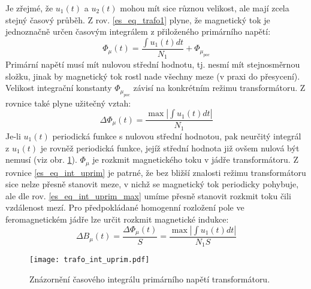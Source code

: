       Je zřejmé, že $u_1(t)$ a  $u_2(t)$ mohou mít sice různou velikost, ale mají zcela stejný 
      časový průběh. Z rov. \ref{es_eq_trafo1} plyne, že magnetický tok je jednoznačně určen 
      časovým integrálem z přiloženého primárního napětí:
      \begin{equation}\label{es_eq_int_uprim}
          \Phi_\mu(t)=\frac{\int u_1(t)dt}{N_1}+\Phi_{\mu_{poc}}
      \end{equation}
      Primární napětí musí mít nulovou střední hodnotu, tj. nesmí mít stejnosměrnou složku, jinak 
      by magnetický tok rostl nade všechny meze (v praxi do přesycení). Velikost integrační 
      konstanty $\Phi_{\mu_{poc}}$ závisí na konkrétním režimu transformátoru. Z rovnice také plyne 
      užitečný vztah:
      \begin{equation}\label{es_eq_int_uprim_max}
          \Delta\Phi_\mu(t)=\frac{\max\left\lvert\int u_1(t)dt\right\rvert}{N_1}
      \end{equation}
      Je-li $u_1(t)$ periodická funkce s nulovou střední hodnotou, pak neurčitý integrál z $u_1(t)$
      je rovněž periodická funkce, jejíž střední hodnota již ovšem nulová být nemusí (viz obr.
      \ref{es:fig_trafo_int_uprim}). $\Phi_\mu$ je rozkmit magnetického toku v jádře transformátoru.
      Z rovnice \ref{es_eq_int_uprim} je patrné, že bez bližší znalosti režimu transformátoru sice 
      nelze přesně stanovit meze, v nichž se magnetický tok periodicky pohybuje, ale dle rov.       
      \ref{es_eq_int_uprim_max} umíme přesně stanovit rozkmit toku čili vzdálenost mezí. Pro 
      předpokládané homogenní rozložení pole ve feromagnetickém jádře lze určit rozkmit magnetické 
      indukce:
      \begin{equation}\label{es_eq_rozkmit_B}
        \Delta B_\mu(t)=\frac{\Delta\Phi_\mu(t)}{S}
                       =\frac{\max\left\lvert\int u_1(t)dt\right\rvert}{N_1S}
      \end{equation}

      \begin{figure}[ht!]
        \centering
        \texttt{[image: trafo\_int\_uprim.pdf]}
        \caption{Znázornění časového integrálu primárního napětí transformátoru.}
        \label{es:fig_trafo_int_uprim}
      \end{figure}

